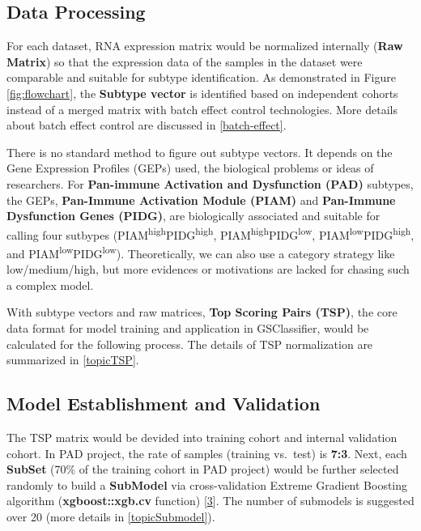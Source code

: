 \documentclass[
  12pt,
]{book}
\begin{document}
\hypertarget{data-processing}{%
\subsection{Data Processing}\label{data-processing}}

For each dataset, RNA expression matrix would be normalized internally (\textbf{Raw Matrix}) so that the expression data of the samples in the dataset were comparable and suitable for subtype identification. As demonstrated in Figure \ref{fig:flowchart}, the \textbf{Subtype vector} is identified based on independent cohorts instead of a merged matrix with batch effect control technologies. More details about batch effect control are discussed in \ref{batch-effect}.

There is no standard method to figure out subtype vectors. It depends on the Gene Expression Profiles (GEPs) used, the biological problems or ideas of researchers. For \textbf{Pan-immune Activation and Dysfunction (PAD)} subtypes, the GEPs, \textbf{Pan-Immune Activation Module (PIAM)} and \textbf{Pan-Immune Dysfunction Genes (PIDG)}, are biologically associated and suitable for calling four sutbypes (PIAM\textsuperscript{high}PIDG\textsuperscript{high}, PIAM\textsuperscript{high}PIDG\textsuperscript{low}, PIAM\textsuperscript{low}PIDG\textsuperscript{high}, and PIAM\textsuperscript{low}PIDG\textsuperscript{low}). Theoretically, we can also use a category strategy like low/medium/high, but more evidences or motivations are lacked for chasing such a complex model.

With subtype vectors and raw matrices, \textbf{Top Scoring Pairs (TSP)}, the core data format for model training and application in GSClassifier, would be calculated for the following process. The details of TSP normalization are summarized in \ref{topicTSP}.

\hypertarget{model-establishment-and-validation}{%
\subsection{Model Establishment and Validation}\label{model-establishment-and-validation}}

The TSP matrix would be devided into training cohort and internal validation cohort. In PAD project, the rate of samples (training vs.~test) is \textbf{7:3}. Next, each \textbf{SubSet} (70\% of the training cohort in PAD project) would be further selected randomly to build a \textbf{SubModel} via cross-validation Extreme Gradient Boosting algorithm (\textbf{xgboost::xgb.cv} function) {[}\protect\hyperlink{ref-RN345}{3}{]}. The number of submodels is suggested over 20 (more details in \ref{topicSubmodel}).
\end{document}
